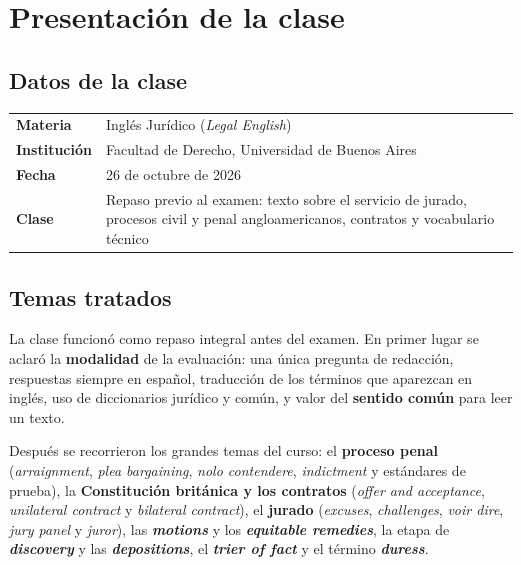 \documentclass[12pt,oneside]{book}
\begin{document}
\frontmatter

\tableofcontents

\chapter{Presentación de la clase}

\section*{Datos de la clase}

\begin{tabularx}{\textwidth}{@{}P{3.2cm}L@{}}
\toprule
\textbf{Materia} & Inglés Jurídico (\textit{Legal English}) \\
\textbf{Institución} & Facultad de Derecho, Universidad de Buenos Aires \\
\textbf{Fecha} & 26 de octubre de 2026 \\
\textbf{Clase} & Repaso previo al examen: texto sobre el servicio de jurado, procesos civil y penal angloamericanos, contratos y vocabulario técnico \\
\bottomrule
\end{tabularx}

\section*{Temas tratados}

La clase funcionó como repaso integral antes del examen. En primer lugar se aclaró la \textbf{modalidad} de la evaluación: una única pregunta de redacción, respuestas siempre en español, traducción de los términos que aparezcan en inglés, uso de diccionarios jurídico y común, y valor del \textbf{sentido común} para leer un texto.

Después se recorrieron los grandes temas del curso: el \textbf{proceso penal} (\textit{arraignment}, \textit{plea bargaining}, \textit{nolo contendere}, \textit{indictment} y estándares de prueba), la \textbf{Constitución británica y los contratos} (\textit{offer and acceptance}, \textit{unilateral contract} y \textit{bilateral contract}), el \textbf{jurado} (\textit{excuses}, \textit{challenges}, \textit{voir dire}, \textit{jury panel} y \textit{juror}), las \textbf{\textit{motions}} y los \textbf{\textit{equitable remedies}}, la etapa de \textbf{\textit{discovery}} y las \textbf{\textit{depositions}}, el \textbf{\textit{trier of fact}} y el término \textbf{\textit{duress}}.
\end{document}
